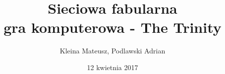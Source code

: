 \documentclass{article}
\title{Sieciowa fabularna\\gra komputerowa - The Trinity}
\author{Kleina Mateusz, Podlawski Adrian}
\date{12 kwietnia 2017}
\begin{document}
\begin{titlepage}
\maketitle
\tableofcontents
\end{titlepage}









	










\end{document}
